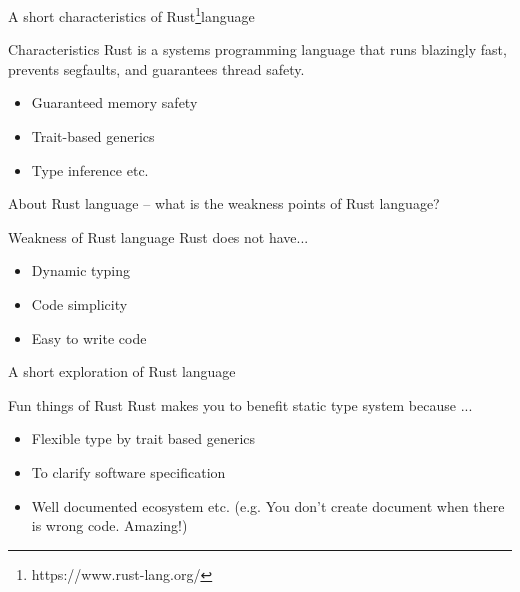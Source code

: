 \documentclass[12pt, unicode]{beamer}
\begin{document}
\begin{frame}{A short characteristics of Rust\footnote[frame]{https://www.rust-lang.org/}language}
\begin{block}{Characteristics}
Rust is a systems programming language that runs blazingly fast, prevents segfaults, and guarantees thread safety.
\end{block}
\begin{itemize}
\item {} {Guaranteed memory safety}
\item {} {Trait-based generics}
\item {} {Type inference etc.}
\end{itemize}
\end{frame}

\begin{frame}{About Rust language -- what is the weakness points of Rust language?}
\begin{block}{Weakness of Rust language}
Rust does not have...
\end{block}
\begin{itemize}
\item {} {Dynamic typing}
\item {} {Code simplicity}
\item {} {Easy to write code}
\end{itemize}
\end{frame}

\newcommand\smallannotate{\fontsize{9}{9.2}\selectfont}
\begin{frame}{A short  exploration of Rust language}
\begin{block}{Fun things of Rust}
Rust makes you to benefit static type system because ... 
\end{block}
\begin{itemize}
\item {} {Flexible type by trait based generics}
\item {} {To clarify software specification}
\item {} {Well documented ecosystem etc. {\smallannotate(e.g. You don't create document when there is wrong code. Amazing!)}}
\end{itemize}
\end{frame}
\end{document}
